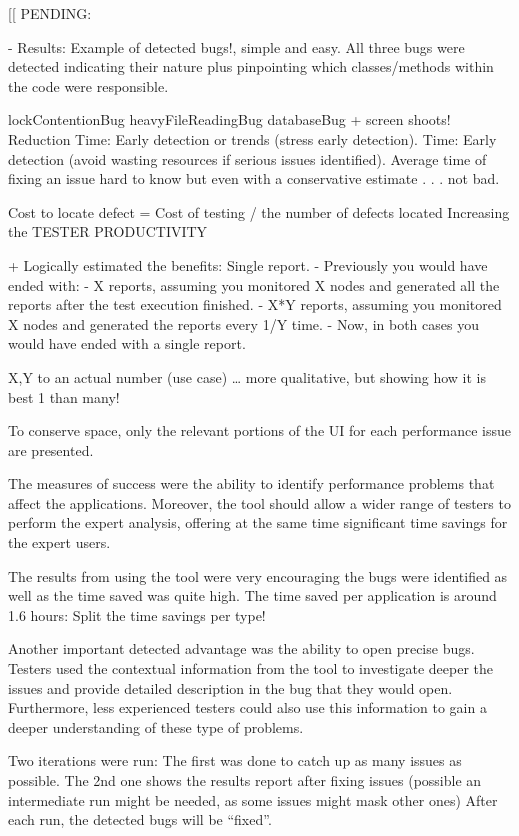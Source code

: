 \documentclass[runningheads,a4paper]{llncs}
\begin{document}
[[
PENDING:

- Results: Example of detected bugs!, simple and easy. All three bugs were
detected indicating their nature plus pinpointing which classes/methods within
the code were responsible.

lockContentionBug
heavyFileReadingBug
databaseBug
+ screen shoots!
Reduction Time: Early detection or trends (stress early detection).
Time: Early detection (avoid wasting resources if serious issues identified).
Average time of fixing an issue hard to know but even with a conservative
estimate . . . not bad.

Cost to locate defect = Cost of testing / the number of defects located
Increasing the TESTER PRODUCTIVITY

+ Logically estimated the benefits: Single report.
- Previously you would have ended with:
- X reports, assuming you monitored X nodes and generated all the reports after
the test execution finished.
- X*Y reports, assuming you monitored X nodes and generated the reports every
1/Y time.
- Now, in both cases you would have ended with a single report.

X,Y to an actual number (use case) … more qualitative, but showing how it is best 1 than many!

To conserve space, only the relevant portions of the UI
for each performance issue are presented.

The measures of success were the ability to identify performance problems that
affect the applications. Moreover, the tool should allow a wider range of
testers to perform the expert analysis, offering at the same time significant time savings for the expert users.

The results from using the tool were very encouraging the bugs were identified
as well as the time saved was quite high. The time saved per application is
around 1.6 hours: Split the time savings per type!

Another important detected advantage was the ability to open precise bugs.
Testers used the contextual information from the tool to investigate deeper the
issues and provide detailed description in the bug that they would open.
Furthermore, less experienced testers could also use this information to gain a
deeper understanding of these type of problems.

Two iterations were run: The first was done to catch up as many issues as
possible. The 2nd one shows the results report after fixing issues (possible an
intermediate run might be needed, as some issues might mask other ones) After each run, the detected bugs will be “fixed”.
\end{document}
